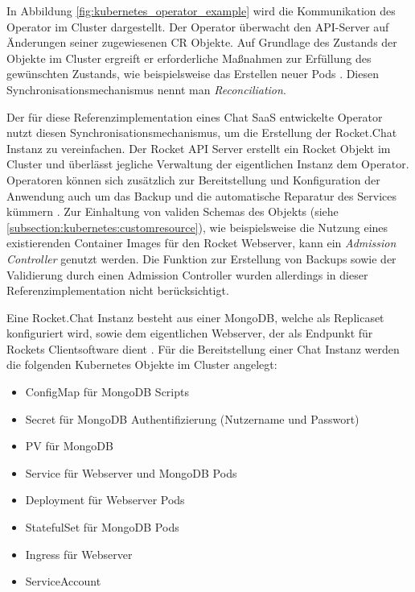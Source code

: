 In Abbildung \ref{fig:kubernetes_operator_example} wird die Kommunikation des Operator im Cluster dargestellt.
Der Operator überwacht den API-Server auf Änderungen seiner zugewiesenen \ac{CR} Objekte.
Auf Grundlage des Zustands der Objekte im Cluster ergreift er erforderliche Maßnahmen zur Erfüllung des gewünschten Zustands,
wie beispielsweise das Erstellen neuer Pods \cite{Dobies2020}.
Diesen Synchronisationsmechanismus nennt man \emph{Reconciliation}.

Der für diese Referenzimplementation eines Chat \ac{SaaS} entwickelte Operator nutzt diesen Synchronisationsmechanismus,
um die Erstellung der Rocket.Chat Instanz zu vereinfachen.
Der Rocket API Server erstellt ein Rocket Objekt im Cluster und überlässt jegliche Verwaltung der eigentlichen Instanz dem Operator.
Operatoren können sich zusätzlich zur Bereitstellung und Konfiguration der Anwendung auch um das Backup
und die automatische Reparatur des Services kümmern \cite{Dobies2020}.
Zur Einhaltung von validen Schemas des Objekts (siehe \ref{subsection:kubernetes:customresource}),
wie beispielsweise die Nutzung eines existierenden Container Images für den Rocket Webserver,
kann ein \emph{Admission Controller} genutzt werden.
Die Funktion zur Erstellung von Backups sowie der Validierung durch einen Admission Controller
wurden allerdings in dieser Referenzimplementation nicht berücksichtigt.


Eine Rocket.Chat Instanz besteht aus einer MongoDB, welche als Replicaset konfiguriert wird,
sowie dem eigentlichen Webserver, der als Endpunkt für Rockets Clientsoftware dient \cite{rocketChatDocs}.
Für die Bereitstellung einer Chat Instanz werden die folgenden Kubernetes Objekte im Cluster angelegt:
\begin{itemize}
  \item ConfigMap für MongoDB Scripts
  \item Secret für MongoDB Authentifizierung (Nutzername und Passwort)
  \item \ac{PV} für MongoDB
  \item Service für Webserver und MongoDB Pods
  \item Deployment für Webserver Pods
  \item StatefulSet für MongoDB Pods
  \item Ingress für Webserver
  \item ServiceAccount
\end{itemize}

\newpage

